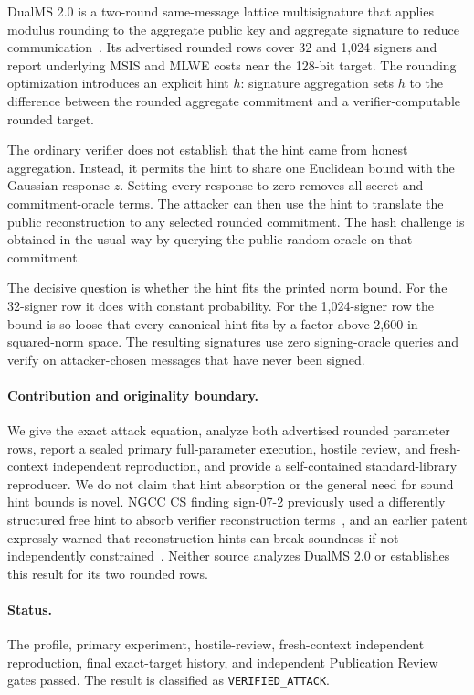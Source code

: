 \documentclass[10pt,a4paper]{article}
\begin{document}
DualMS 2.0 is a two-round same-message lattice multisignature that applies
modulus rounding to the aggregate public key and aggregate signature to reduce
communication~\cite{dualms2}. Its advertised rounded rows cover 32 and 1,024
signers and report underlying MSIS and MLWE costs near the 128-bit target. The
rounding optimization introduces an explicit hint $h$: signature aggregation
sets $h$ to the difference between the rounded aggregate commitment and a
verifier-computable rounded target.

The ordinary verifier does not establish that the hint came from honest
aggregation. Instead, it permits the hint to share one Euclidean bound with
the Gaussian response $z$. Setting every response to zero removes all secret
and commitment-oracle terms. The attacker can then use the hint to translate
the public reconstruction to any selected rounded commitment. The hash
challenge is obtained in the usual way by querying the public random oracle on
that commitment.

The decisive question is whether the hint fits the printed norm bound. For the
32-signer row it does with constant probability. For the 1,024-signer row the
bound is so loose that every canonical hint fits by a factor above 2,600 in
squared-norm space. The resulting signatures use zero signing-oracle queries
and verify on attacker-chosen messages that have never been signed.

\paragraph{Contribution and originality boundary.}
We give the exact attack equation, analyze both advertised rounded parameter
rows, report a sealed primary full-parameter execution, hostile review, and
fresh-context independent reproduction, and provide a self-contained
standard-library reproducer. We do not claim that hint absorption or the
general need for sound hint bounds is novel.
NGCC CS finding sign-07-2 previously used a differently structured free hint
to absorb verifier reconstruction terms~\cite{ngcccs}, and an earlier patent
expressly warned that reconstruction hints can break soundness if not
independently constrained~\cite{hintpatent}. Neither source analyzes DualMS
2.0 or establishes this result for its two rounded rows.

\paragraph{Status.}
The profile, primary experiment, hostile-review, fresh-context independent
reproduction, final exact-target history, and independent Publication Review
gates passed. The result is classified as
\texttt{VERIFIED\_ATTACK}.
\end{document}
